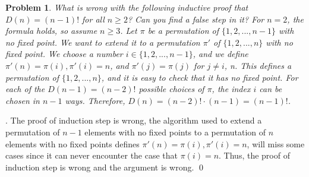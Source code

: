 \documentclass[12pt]{article}
\newtheorem{hw}{Problem}
\newenvironment{sol}
  {\par\vspace{3mm}\noindent{\it Solution}.}
  {\qed}
\begin{document}
\begin{hw}
What is wrong with the following inductive proof that $D(n) =
(n-1)!$ for all $n \geq 2$? Can you find a false step in it? For $n = 2$,
the formula holds, so assume $n \geq 3$. Let $\pi$ be a permutation of
$\{1, 2, . . . , n-1\}$ with no fixed point. We want to extend it to a permutation
$\pi'$ of $\{1, 2, . . . , n\}$ with no fixed point. We choose a number
$i \in \{1, 2, . . . , n-1\}$, and we define $\pi'(n) = \pi(i), \pi'(i) = n$, and $\pi'(j) = \pi(j)$ for $j\neq i$, n. This defines a permutation of $\{1, 2, . . . , n\}$, and it is easy
to check that it has no fixed point. For each of the $D(n-1) = (n-2)!$
possible choices of $\pi$, the index $i$ can be chosen in $n-1$ ways. Therefore,
$D(n) = (n-2)! \cdot (n-1) = (n-1)!$.
\end{hw}
\begin{sol}
	The proof of induction step is wrong, the algorithm used to extend a permutation of $n-1$ elements with no fixed points to a permutation of $n$ elements with no fixed points defines $\pi'(n) = \pi(i), \pi'(i) = n$, will miss some cases since it can never encounter the case that $\pi(i) = n$. Thus, the proof of induction step is wrong and the argument is wrong.
\end{sol}
\end{document}
